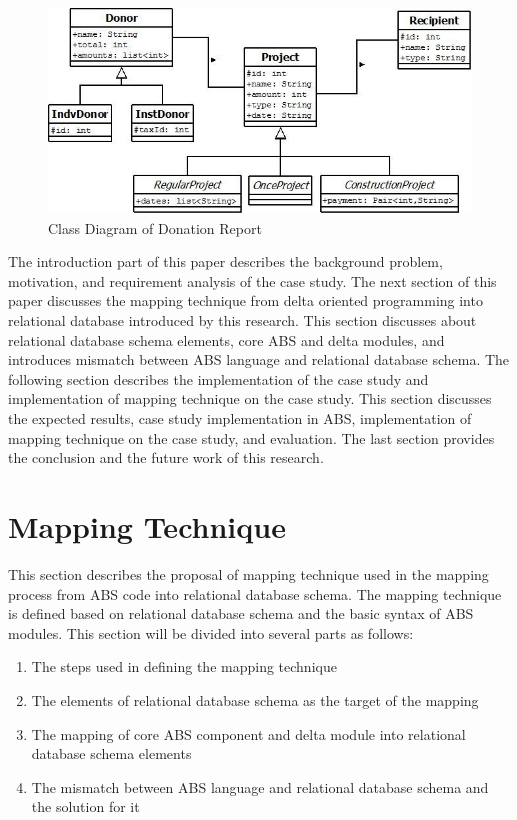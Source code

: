 \documentclass[runningheads,a4paper]{llncs}
\begin{document}
\begin{figure}
	\centering
	\includegraphics[scale=0.65]{classDiagram.jpg}
	\caption{Class Diagram of Donation Report}
	\label{class diagram}
\end{figure}

The introduction part of this paper describes the background problem, motivation, and requirement analysis of the case study. The next section of this paper discusses the mapping technique from delta oriented programming into relational database introduced by this research. This section discusses about relational database schema elements, core ABS and delta modules, and introduces mismatch between ABS language and relational database schema. The following section describes the implementation of the case study and implementation of mapping technique on the case study. This section discusses the expected results, case study implementation in ABS, implementation of mapping technique on the case study, and evaluation. The last section provides the conclusion and the future work of this research.

\section{Mapping Technique}
This section describes the proposal of mapping technique used in the mapping process from ABS code into relational database schema. The mapping technique is defined based on relational database schema and the basic syntax of ABS modules. This section will be divided into several parts as follows:
\begin{enumerate}
	\item The steps used in defining the mapping technique
	\item The elements of relational database schema as the target of the mapping
	\item The mapping of core ABS component and delta module into relational database schema elements
	\item The mismatch between ABS language and relational database schema and the solution for it
\end{enumerate}
\end{document}
